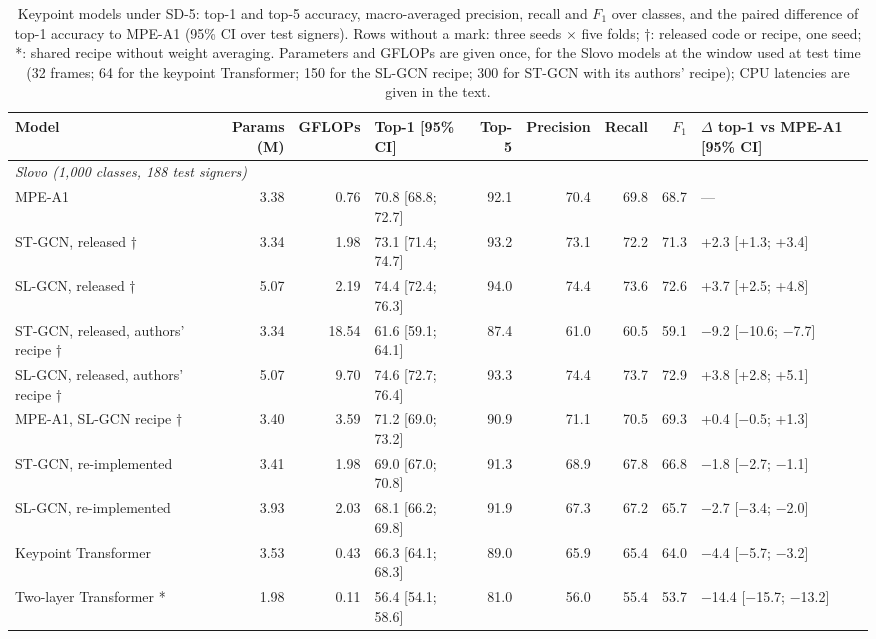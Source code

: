 \documentclass[a4paper,fleqn]{cas-dc}
\begin{document}
\begin{table}[t]
\caption{Keypoint models under SD-5: top-1 and top-5 accuracy, macro-averaged precision, recall and $F_1$ over classes, and the paired difference of top-1 accuracy to MPE-A1 (95\% CI over test signers). Rows without a mark: three seeds $\times$ five folds; †: released code or recipe, one seed; *: shared recipe without weight averaging. Parameters and GFLOPs are given once, for the Slovo models at the window used at test time (32 frames; 64 for the keypoint Transformer; 150 for the SL-GCN recipe; 300 for ST-GCN with its authors' recipe); CPU latencies are given in the text.}\label{tab:rsl_main}
\scriptsize\setlength{\tabcolsep}{3pt}
\centering
\begin{tabular}{lrrlrrrrl}
\toprule
\textbf{Model} & \textbf{Params (M)} & \textbf{GFLOPs} & \textbf{Top-1 [95\% CI]} & \textbf{Top-5} & \textbf{Precision} & \textbf{Recall} & \textbf{$F_1$} & \textbf{$\Delta$ top-1 vs MPE-A1 [95\% CI]} \\
\midrule
\multicolumn{9}{l}{\textit{Slovo (1,000 classes, 188 test signers)}} \\
MPE-A1 & 3.38 & 0.76 & 70.8 [68.8; 72.7] & 92.1 & 70.4 & 69.8 & 68.7 & --- \\
ST-GCN, released † & 3.34 & 1.98 & 73.1 [71.4; 74.7] & 93.2 & 73.1 & 72.2 & 71.3 & +2.3 [+1.3; +3.4] \\
SL-GCN, released † & 5.07 & 2.19 & 74.4 [72.4; 76.3] & 94.0 & 74.4 & 73.6 & 72.6 & +3.7 [+2.5; +4.8] \\
ST-GCN, released, authors' recipe † & 3.34 & 18.54 & 61.6 [59.1; 64.1] & 87.4 & 61.0 & 60.5 & 59.1 & $-$9.2 [$-$10.6; $-$7.7] \\
SL-GCN, released, authors' recipe † & 5.07 & 9.70 & 74.6 [72.7; 76.4] & 93.3 & 74.4 & 73.7 & 72.9 & +3.8 [+2.8; +5.1] \\
MPE-A1, SL-GCN recipe † & 3.40 & 3.59 & 71.2 [69.0; 73.2] & 90.9 & 71.1 & 70.5 & 69.3 & +0.4 [$-$0.5; +1.3] \\
ST-GCN, re-implemented & 3.41 & 1.98 & 69.0 [67.0; 70.8] & 91.3 & 68.9 & 67.8 & 66.8 & $-$1.8 [$-$2.7; $-$1.1] \\
SL-GCN, re-implemented & 3.93 & 2.03 & 68.1 [66.2; 69.8] & 91.9 & 67.3 & 67.2 & 65.7 & $-$2.7 [$-$3.4; $-$2.0] \\
Keypoint Transformer & 3.53 & 0.43 & 66.3 [64.1; 68.3] & 89.0 & 65.9 & 65.4 & 64.0 & $-$4.4 [$-$5.7; $-$3.2] \\
Two-layer Transformer * & 1.98 & 0.11 & 56.4 [54.1; 58.6] & 81.0 & 56.0 & 55.4 & 53.7 & $-$14.4 [$-$15.7; $-$13.2] \\

\end{tabular}
\end{table}
\end{document}
